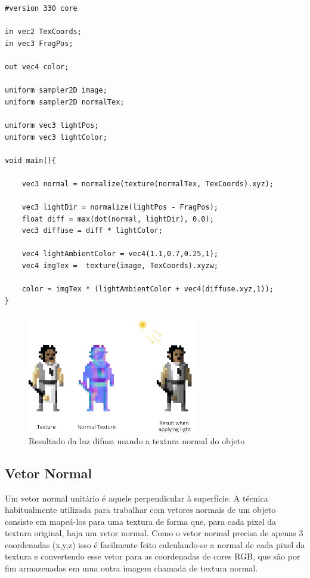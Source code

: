 \documentclass[12pt, 
openright, 
oneside, 
a4paper,    
brazil]{facom-ufu-abntex2}
\begin{document}
\begin{lstlisting}[caption=Fragment Shader com luz ambiente e difusa, label={alg:FSAmbientDifuse}]
#version 330 core

in vec2 TexCoords;
in vec3 FragPos;  

out vec4 color;

uniform sampler2D image;
uniform sampler2D normalTex;

uniform vec3 lightPos; 
uniform vec3 lightColor;

void main(){

	vec3 normal = normalize(texture(normalTex, TexCoords).xyz);

	vec3 lightDir = normalize(lightPos - FragPos);
	float diff = max(dot(normal, lightDir), 0.0);
	vec3 diffuse = diff * lightColor;
	
	vec4 lightAmbientColor = vec4(1.1,0.7,0.25,1);
	vec4 imgTex =  texture(image, TexCoords).xyzw;
	
	color = imgTex * (lightAmbientColor + vec4(diffuse.xyz,1));
}
\end{lstlisting}



\begin{figure}[H]
	\centering
	\includegraphics[width=20em]{imagens/normalTextureExample.png}
	\caption{Resultado da luz difusa usando a textura normal do objeto}
	\label{fig:DifuseAmbientResult}
\end{figure}

\subsection{Vetor Normal}

Um vetor normal unitário é aquele perpendicular à superfície. A técnica habitualmente utilizada para trabalhar com vetores normais de um objeto consiste em mapeá-los para uma textura de forma que, para cada pixel da textura original, haja um vetor normal. Como o vetor normal precisa de apenas 3 coordenadas (x,y,z) isso é facilmente feito calculando-se a normal de cada pixel da textura e convertendo esse vetor para as coordenadas de cores RGB, que são por fim armazenadas em uma outra imagem chamada de textura normal.
\end{document}
